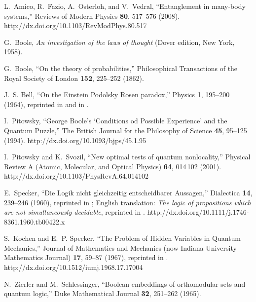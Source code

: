 \documentclass[fleqn,twoside]{article}      %
\begin{document}
\begin{thebibliography}{10}
L.~Amico, R.~Fazio, A.~Osterloh, and V.~Vedral, \enquote{Entanglement in
  many-body systems,} Reviews of Modern Physics {\bf 80}, 517--576 (2008).
\newline http://dx.doi.org/10.1103/RevModPhys.80.517

G.~Boole, {\em An investigation of the laws of thought\/} (Dover edition, New
  York, 1958).

G.~Boole, \enquote{On the theory of probabilities,} Philosophical Transactions
  of the Royal Society of London {\bf 152}, 225--252 (1862).

J.~S. Bell, \enquote{On the {E}instein {P}odolsky {R}osen paradox,} Physics
  {\bf 1}, 195--200 (1964), reprinted in \cite[pp. 403-408]{wheeler-Zurek:83}
  and in \cite[pp. 14-21]{bell-87}.

I.~Pitowsky, \enquote{{G}eorge {B}oole's `Conditions od Possible Experience'
  and the Quantum Puzzle,} The British Journal for the Philosophy of Science
  {\bf 45}, 95--125 (1994).
\newline http://dx.doi.org/10.1093/bjps/45.1.95

I.~Pitowsky and K.~Svozil, \enquote{New optimal tests of quantum nonlocality,}
  Physical Review A (Atomic, Molecular, and Optical Physics) {\bf 64}, 014\,102
  (2001).
\newline http://dx.doi.org/10.1103/PhysRevA.64.014102

E.~Specker, \enquote{{D}ie {L}ogik nicht gleichzeitig entscheidbarer
  {A}ussagen,} Dialectica {\bf 14}, 239--246 (1960), reprinted in \cite[pp.
  175--182]{specker-ges}; {E}nglish translation: {\it The logic of propositions
  which are not simultaneously decidable}, reprinted in \cite[pp.
  135-140]{hooker}.
\newline http://dx.doi.org/10.1111/j.1746-8361.1960.tb00422.x

S.~Kochen and E.~P. Specker, \enquote{The Problem of Hidden Variables in
  Quantum Mechanics,} Journal of Mathematics and Mechanics (now Indiana
  University Mathematics Journal) {\bf 17}, 59--87 (1967), reprinted in
  \cite[pp. 235--263]{specker-ges}.
\newline http://dx.doi.org/10.1512/iumj.1968.17.17004

N.~Zierler and M.~Schlessinger, \enquote{Boolean embeddings of orthomodular
  sets and quantum logic,} Duke Mathematical Journal {\bf 32}, 251--262 (1965).


\end{thebibliography}
\end{document}
